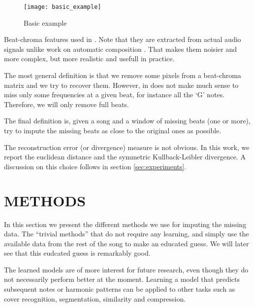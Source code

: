 \documentclass{article}
\begin{document}
\begin{figure}[t]
\begin{center}
\texttt{[image: basic\_example]}
\end{center}
\caption{Basic example}
\label{fig:code}
\end{figure}

Beat-chroma features used in \cite{Ellis2007a}.
Note that they are extracted from actual audio signals unlike work on automatic composition
\cite{Eck2002d}. That makes them noisier and more complex, but more realistic and usefull
in practice.

The most general definition is that we remove some pixels from a beat-chroma matrix and
we try to recover them. However, in does not make much sense to miss only some frequencies
at a given beat, for instance all the `G' notes. Therefore, we will only remove full
beats.

The final definition is, given a song and a window of missing beats (one or more),
try to impute the missing beats as close to the original ones as possible.

The reconstruction error (or divergence) measure is not obvious. In this work,
we report the euclidean distance and the symmetric Kullback-Leibler divergence.
A discussion on this choice follows in section \ref{sec:experiments}.


\section{METHODS}
\label{sec:methods}
In this section we present the different methods we use for imputing the missing data.
The ``trivial methods'' that do not require any learning, and simply use the available
data from the rest of the song to make an educated guess. We will later see that this
eudcated guess is remarkably good.

The learned models are of more interest for future research, even though they do not
necessarily perform better at the moment. Learning a model that predicts subsequent
notes or harmonic patterns can be applied to other tasks such as cover recognition,
segmentation, similarity and compression.
\end{document}
